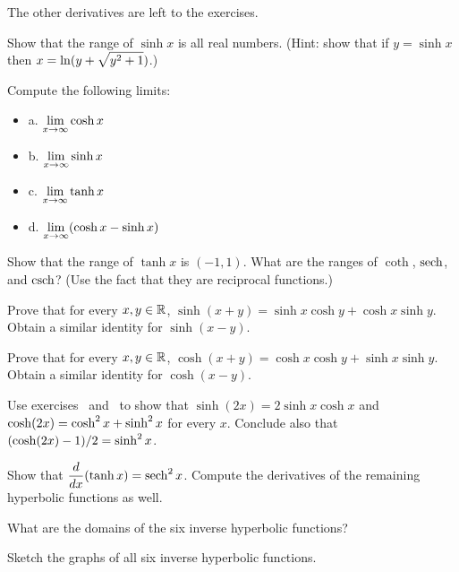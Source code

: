 The other derivatives are left to the exercises.


\begin{exercises}

\exercise Show that the range of $\sinh x$ is all real
numbers. (Hint: show that if $y=\sinh x$ then 
$\displaystyle x =\ln (y+\sqrt{y^2+1})$.) 

\exercise Compute the following limits:
\begin{itemize} %

\item{a.} $\displaystyle  \lim_{x\to \infty } \cosh x$
\item{b.} $\displaystyle  \lim_{x\to \infty } \sinh x$
\item{c.} $\displaystyle  \lim_{x\to \infty } \tanh x$
\item{d.} $\displaystyle  \lim_{x\to \infty } (\cosh x -\sinh x)$

\end{itemize}

\exercise Show that the range of $\tanh x$ is $(-1,1)$. What
are the ranges of $\coth$, $\operatorname{sech}$, and $\operatorname{csch}$? 
(Use the fact that they are reciprocal functions.) 

\exercise
\label{exer:sinhid} 
Prove that for every $x,y\in\mathbb{R}$, $\sinh (x+y)
=\sinh x \cosh y + \cosh x \sinh y$. Obtain a similar identity for
$\sinh(x-y)$.

\exercise
\label{exer:coshid} 
Prove that for every $x,y\in\mathbb{R}$, $\cosh (x+y) =\cosh x \cosh y + \sinh x
  \sinh y$. Obtain a similar identity for $\cosh(x-y)$.

\exercise 
\label{exer:hyperbolic double angle formulas}
Use exercises~ and~ 
to
show that $\sinh(2x)=2\sinh x \cosh x$ and $\displaystyle \cosh(2x)=\cosh^2 x
+\sinh^2 x$ for every $x$.  Conclude also that $\displaystyle (\cosh (2x) -1)/2 = \sinh
^2 x$.

\exercise Show that $\displaystyle {d\over dx} (\tanh x) =\operatorname{sech}^2 x$. Compute
  the derivatives of the remaining hyperbolic functions as well.

\exercise What are the domains of the six inverse hyperbolic
functions?

\exercise Sketch the graphs of all six inverse hyperbolic
  functions. 

\end{exercises}
